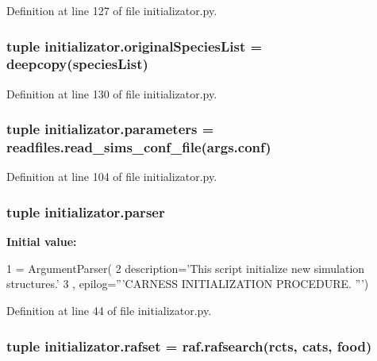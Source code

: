 Definition at line 127 of file initializator.\-py.

\hypertarget{a00104_ab4024b0cf8a4136e81ae636c9cf6e0e4}{
\subsubsection[{original\-Species\-List}]{\setlength{\rightskip}{0pt plus 5cm}tuple initializator.\-original\-Species\-List = deepcopy({\bf species\-List})}}\label{a00104_ab4024b0cf8a4136e81ae636c9cf6e0e4}


Definition at line 130 of file initializator.\-py.

\hypertarget{a00104_a646de756d594b9a0eebf18c4eb9ee0d6}{
\subsubsection[{parameters}]{\setlength{\rightskip}{0pt plus 5cm}tuple initializator.\-parameters = readfiles.\-read\-\_\-sims\-\_\-conf\-\_\-file(args.\-conf)}}\label{a00104_a646de756d594b9a0eebf18c4eb9ee0d6}


Definition at line 104 of file initializator.\-py.

\hypertarget{a00104_af2659789ba1896029e3ab9bfbf83d019}{
\subsubsection[{parser}]{\setlength{\rightskip}{0pt plus 5cm}tuple initializator.\-parser}}\label{a00104_af2659789ba1896029e3ab9bfbf83d019}
{\bfseries Initial value\-:}
\begin{DoxyCode}
1 = ArgumentParser(
2                                 description=\textcolor{stringliteral}{'This script initialize new simulation structures.'}
3                                 , epilog=\textcolor{stringliteral}{'''CARNESS INITIALIZATION PROCEDURE. '''})
\end{DoxyCode}


Definition at line 44 of file initializator.\-py.

\hypertarget{a00104_a1d1d6b79a11a2c646cdccd86ed33c06e}{
\subsubsection[{rafset}]{\setlength{\rightskip}{0pt plus 5cm}tuple initializator.\-rafset = raf.\-rafsearch(rcts, cats, {\bf food})}}\label{a00104_a1d1d6b79a11a2c646cdccd86ed33c06e}


